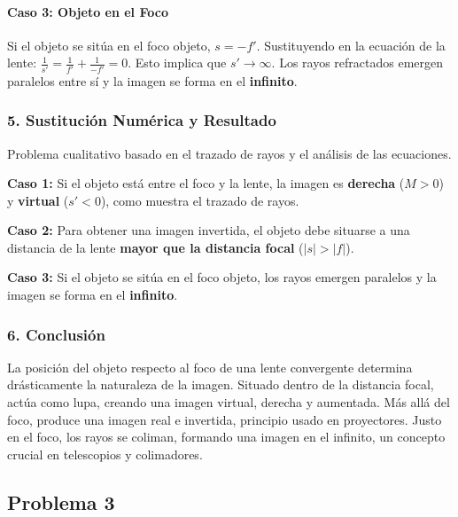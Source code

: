 \paragraph*{Caso 3: Objeto en el Foco}
Si el objeto se sitúa en el foco objeto, $s = -f'$. Sustituyendo en la ecuación de la lente:
$\frac{1}{s'} = \frac{1}{f'} + \frac{1}{-f'} = 0$.
Esto implica que $s' \to \infty$. Los rayos refractados emergen paralelos entre sí y la imagen se forma en el \textbf{infinito}.

\subsubsection*{5. Sustitución Numérica y Resultado}
Problema cualitativo basado en el trazado de rayos y el análisis de las ecuaciones.
\begin{cajaresultado}
    \textbf{Caso 1:} Si el objeto está entre el foco y la lente, la imagen es \textbf{derecha} ($M>0$) y \textbf{virtual} ($s'<0$), como muestra el trazado de rayos.
\end{cajaresultado}
\begin{cajaresultado}
    \textbf{Caso 2:} Para obtener una imagen invertida, el objeto debe situarse a una distancia de la lente \textbf{mayor que la distancia focal} ($|s| > |f|$).
\end{cajaresultado}
\begin{cajaresultado}
    \textbf{Caso 3:} Si el objeto se sitúa en el foco objeto, los rayos emergen paralelos y la imagen se forma en el \textbf{infinito}.
\end{cajaresultado}

\subsubsection*{6. Conclusión}
\begin{cajaconclusion}
La posición del objeto respecto al foco de una lente convergente determina drásticamente la naturaleza de la imagen. Situado dentro de la distancia focal, actúa como lupa, creando una imagen virtual, derecha y aumentada. Más allá del foco, produce una imagen real e invertida, principio usado en proyectores. Justo en el foco, los rayos se coliman, formando una imagen en el infinito, un concepto crucial en telescopios y colimadores.
\end{cajaconclusion}

\newpage

\subsection{Problema 3}
\label{subsec:P3_2023_jul_ord}

